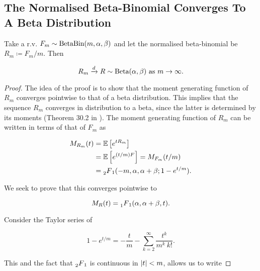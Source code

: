 \documentclass[../../main.tex]{subfiles}
\begin{document}
\subsection{The Normalised Beta-Binomial Converges To A Beta Distribution}

\begin{lemma} \label{lemma:RisBeta}
    Take a r.v. $F_m \sim \text{Beta}\text{Bin}(m, \alpha, 
    \beta)$ and let the normalised beta-binomial be $R_m \coloneqq F_m / m$. Then

    \begin{equation}
        R_m \xrightarrow{d} R \sim \text{Beta}(\alpha, \beta) \text{ as } m\rightarrow \infty. 
    \end{equation}
\end{lemma}

\begin{proof}
    The idea of the proof is to show that the moment generating function of $R_m$ converges pointwise to that of a beta distribution. This implies that the sequence $R_m$ converges in distribution to a beta, since the latter is determined by its moments (Theorem 30.2 in \cite{billingsley_probability_1995}). The moment generating function of $R_m$ can be written in terms of that of $F_m$  as 

    \begin{equation} \label{eq:mgf_rm}
        \begin{split}
            M_{R_m}(t) &= \mathbb{E}\left[e^{t R_m}\right] \\ 
            &= \mathbb{E}\left[e^{(t / m) F}\right] = M_{F_m}(t / m) \\
            &= \prescript{}{2}{F}_1(-m, \alpha, \alpha + \beta; 1 - e^{t / m}). 
        \end{split}
    \end{equation}

    We seek to prove that this converges pointwise to 

    \begin{equation}
        M_R(t) = \prescript{}{1}{F}_1(\alpha, \alpha + \beta, t).
    \end{equation}

    Consider the Taylor series of 

    \begin{equation}
        1 - e^{t / m} = -\frac{t}{m} - \sum^{\infty}_{k = 2} \frac{t^k}{m^k \ k!}.
    \end{equation}

    This and the fact that $\prescript{}{2}{F}_1$ is continuous in $\left\lvert t\right\rvert < m$, allows us to write


\end{proof}
\end{document}
